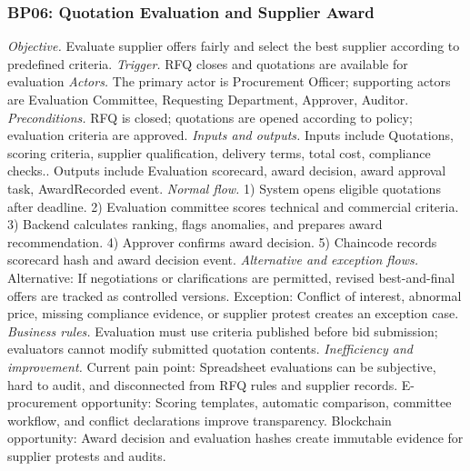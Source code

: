 \documentclass[conference]{IEEEtran}
\begin{document}
\subsubsection{BP06: Quotation Evaluation and Supplier Award}
\textit{Objective.} Evaluate supplier offers fairly and select the best supplier according to predefined criteria.
\textit{Trigger.} RFQ closes and quotations are available for evaluation
\textit{Actors.} The primary actor is Procurement Officer; supporting actors are Evaluation Committee, Requesting Department, Approver, Auditor.
\textit{Preconditions.} RFQ is closed; quotations are opened according to policy; evaluation criteria are approved.
\textit{Inputs and outputs.} Inputs include Quotations, scoring criteria, supplier qualification, delivery terms, total cost, compliance checks.. Outputs include Evaluation scorecard, award decision, award approval task, AwardRecorded event.
\textit{Normal flow.} 1) System opens eligible quotations after deadline. 2) Evaluation committee scores technical and commercial criteria. 3) Backend calculates ranking, flags anomalies, and prepares award recommendation. 4) Approver confirms award decision. 5) Chaincode records scorecard hash and award decision event.
\textit{Alternative and exception flows.} Alternative: If negotiations or clarifications are permitted, revised best-and-final offers are tracked as controlled versions. Exception: Conflict of interest, abnormal price, missing compliance evidence, or supplier protest creates an exception case.
\textit{Business rules.} Evaluation must use criteria published before bid submission; evaluators cannot modify submitted quotation contents.
\textit{Inefficiency and improvement.} Current pain point: Spreadsheet evaluations can be subjective, hard to audit, and disconnected from RFQ rules and supplier records. E-procurement opportunity: Scoring templates, automatic comparison, committee workflow, and conflict declarations improve transparency. Blockchain opportunity: Award decision and evaluation hashes create immutable evidence for supplier protests and audits.
\end{document}

